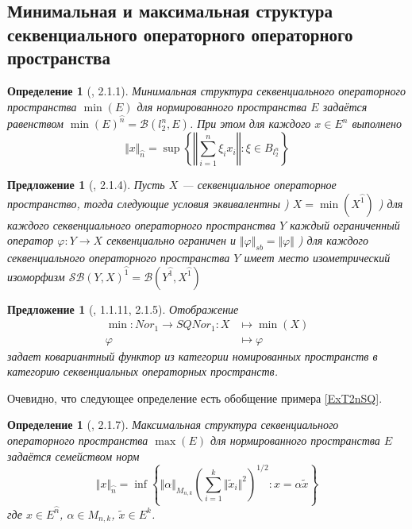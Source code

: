 \documentclass[12pt]{article}
\newtheorem{proposition}[theorem]{Предложение}
\newtheorem{definition}[theorem]{Определение}
\begin{document}
\subsection{Минимальная и максимальная структура секвенциального операторного операторного пространства}

\begin{definition}[\cite{LamOpFolgen}, 2.1.1]\label{DefSQMin} Минимальная структура секвенциального операторного пространства $\min(E)$ для нормированного пространства $E$ задаётся равенством $\min(E)^{\wideparen{n}} = \mathcal{B}(l_2^n, E)$. 
При этом для каждого $x \in E^n$ выполнено
$$
\Vert x\Vert_{\wideparen{n}}=\sup\left\{\left\Vert\sum\limits_{i=1}^n \xi_i x_i\right\Vert:\xi\in B_{l_2^n}\right\}
$$
\end{definition}

\begin{proposition}[\cite{LamOpFolgen}, 2.1.4]\label{PrCharMinSQ}
Пусть $X$ --- секвенциальное операторное пространство, тогда следующие условия эквивалентны
) $X=\min(X^{\wideparen{1}})$
) для каждого секвенциального операторного пространства $Y$ каждый ограниченный оператор $\varphi:Y\to X$ секвенциально  ограничен и $\Vert\varphi\Vert_{sb}=\Vert\varphi\Vert$
) для каждого секвенциального операторного пространства $Y$ имеет место изометрический изоморфизм $\mathcal{SB}(Y,X)^{\wideparen{1}}=\mathcal{B}(Y^{\wideparen{1}},X^{\wideparen{1}})$
\end{proposition}

\begin{proposition}[\cite{LamOpFolgen}, 1.1.11, 2.1.5]\label{PrMinFucntor}
Отображение
$$
\begin{aligned}
\min : Nor_1 \to SQNor_1 : X&\mapsto \min(X)\\
\varphi&\mapsto\varphi
\end{aligned}
$$
задает ковариантный функтор из категории номированных пространств в категорию секвенциальных  операторных пространств.
\end{proposition}

Очевидно, что следующее определение есть обобщение примера \ref{ExT2nSQ}.

\begin{definition}[\cite{LamOpFolgen}, 2.1.7]\label{DefSQMax} Максимальная структура секвенциального операторного пространства $\max(E)$ для нормированного пространства $E$ задаётся семейством норм
$$
\Vert x\Vert_{\wideparen{n}}=\inf\left\{\Vert\alpha\Vert_{M_{n,k}}\left(\sum\limits_{i=1}^k\Vert\tilde  x_i\Vert^2\right)^{1/2}:x=\alpha\tilde x\right\}
$$
где $x\in E^{\wideparen{n}}$, $\alpha\in M_{n,k}$, $\tilde{x}\in E^k$.
\end{definition}
\end{document}
